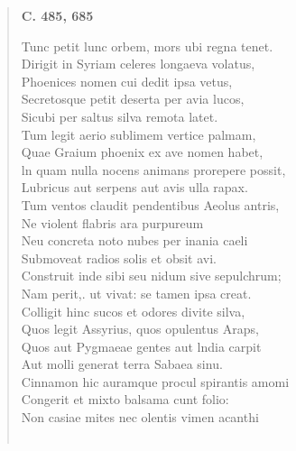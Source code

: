 \documentclass[11pt, a4paper]{report}
\begin{document}
\begin{verse}
    \begin{center} \textbf{C. 485, 685} \end{center}Tunc petit lunc orbem, mors ubi regna tenet. \\ Dirigit in Syriam celeres longaeva volatus, \\ Phoenices nomen cui dedit ipsa vetus, \\ Secretosque petit deserta per avia lucos, \\ Sicubi per saltus silva remota latet. \\ Tum legit aerio sublimem vertice palmam, \\ Quae Graium phoenix ex ave nomen habet, \\ ln quam nulla nocens animans prorepere possit, \\ Lubricus aut serpens aut avis ulla rapax. \\ Tum ventos claudit pendentibus Aeolus antris, \\ Ne violent flabris ara purpureum \\ Neu concreta noto nubes per inania caeli \\ Submoveat radios solis et obsit avi. \\ Construit inde sibi seu nidum sive sepulchrum; \\ Nam perit,. ut vivat: se tamen ipsa creat. \\ Colligit hinc sucos et odores divite silva, \\ Quos legit Assyrius, quos opulentus Araps, \\ Quos aut Pygmaeae gentes aut lndia carpit \\ Aut molli generat terra Sabaea sinu. \\ Cinnamon hic auramque procul spirantis amomi \\ Congerit et mixto balsama cunt folio: \\ Non casiae mites nec olentis vimen acanthi \\ 
        ﻿\pagebreak 

\end{verse}
\end{document}
